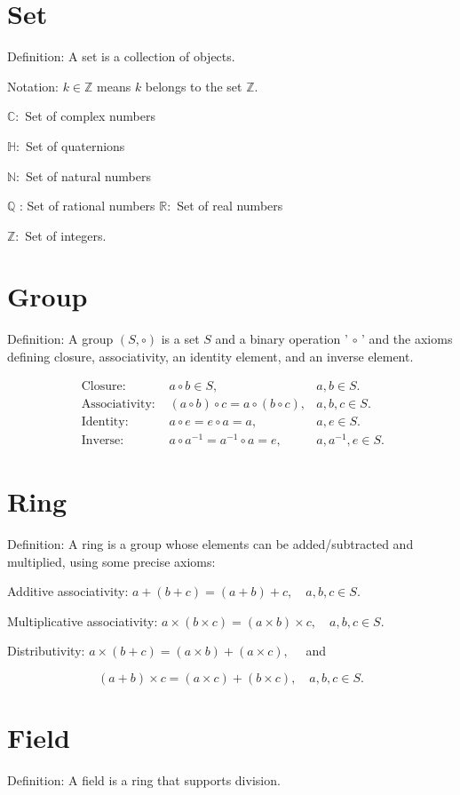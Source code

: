 \documentclass[10pt]{article}
\begin{document}
\section{Set}
Definition: A set is a collection of objects.

Notation: $k \in \mathbb{Z}$ means $k$ belongs to the set $\mathbb{Z}$.

$\mathbb{C}:$ Set of complex numbers

$\mathbb{H}:$ Set of quaternions

$\mathbb{N}:$ Set of natural numbers

$\mathbb{Q}$ : Set of rational numbers $\mathbb{R}:$ Set of real numbers

$\mathbb{Z}:$ Set of integers.

\section{Group}
Definition: A group $(S, \circ)$ is a set $S$ and a binary operation ' $\circ$ ' and the axioms defining closure, associativity, an identity element, and an inverse element.

$$
\begin{array}{rlr}
\text { Closure: } & a \circ b \in S, & a, b \in S . \\
\text { Associativity: } & (a \circ b) \circ c=a \circ(b \circ c), & a, b, c \in S . \\
\text { Identity: } & a \circ e=e \circ a=a, & a, e \in S . \\
\text { Inverse: } & a \circ a^{-1}=a^{-1} \circ a=e, & a, a^{-1}, e \in S .
\end{array}
$$

\section{Ring}
Definition: A ring is a group whose elements can be added/subtracted and multiplied, using some precise axioms:

Additive associativity: $a+(b+c)=(a+b)+c, \quad a, b, c \in S$.

Multiplicative associativity: $a \times(b \times c)=(a \times b) \times c, \quad a, b, c \in S$.

Distributivity: $a \times(b+c)=(a \times b)+(a \times c), \quad$ and

$$
(a+b) \times c=(a \times c)+(b \times c), \quad a, b, c \in S .
$$

\section{Field}
Definition: A field is a ring that supports division.
\end{document}
